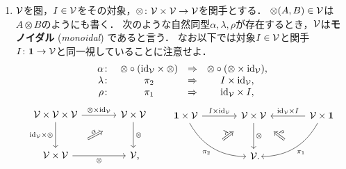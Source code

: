 \documentclass[uplatex,a4paper,dvipdfmx]{jsarticle}
\begin{document}
\begin{dfn}
    \label{dfn:monoidal_category}
    \begin{enumerate}
        \item ${\mathcal{V}}$を圏，$I \in {\mathcal{V}}$をその対象，$\otimes \colon {\mathcal{V}} \times {\mathcal{V}} \to {\mathcal{V}}$を関手とする．
            $\otimes(A, B) \in {\mathcal{V}}$は$A \otimes B$のようにも書く．
            次のような自然同型$\alpha, \lambda, \rho$が存在するとき，${\mathcal{V}}$は\textbf{モノイダル} (\textit{monoidal}) であると言う．
            なお以下では対象$I \in {\mathcal{V}}$と関手$I \colon \mathbf{1} \to {\mathcal{V}}$と同一視していることに注意せよ．
            \begin{equation*}
                \begin{array}{rccc}
                    \alpha \colon & \otimes \circ (\mathrm{id}_{\mathcal{V}} \times \otimes) & \Rightarrow & \otimes \circ (\otimes \times \mathrm{id}_{\mathcal{V}}), \\
                    \lambda \colon & \pi_2 & \Rightarrow & I \times \mathrm{id}_{\mathcal{V}}, \\
                    \rho \colon & \pi_1 & \Rightarrow & \mathrm{id}_{\mathcal{V}} \times I,
                \end{array}
            \end{equation*}
            \begin{equation} \label{equation:diagram_monoidal_isomorphisms}
                \begin{tikzcd}[sep=large]
                    \Vcal \times \Vcal \times \Vcal  \arrow[r, "\otimes \times \id_\Vcal"] \arrow[d, "\id_\Vcal \times \otimes"'] & \Vcal \times \Vcal \arrow[d, "\otimes"] \\
                    \Vcal \arrow[ur, Rightarrow, shorten=7mm, "\alpha" sloped]\times \Vcal \arrow[r, "\otimes"'] & \Vcal\rlap{,}
                \end{tikzcd}
                \qquad
                \begin{tikzcd}[sep=large]
                    \onebf \times \Vcal \arrow[r, "I \times \id_\Vcal"] \arrow[rd, bend right, "\pi_2"' name=X]
                        & \Vcal \times \Vcal \arrow[d, "\otimes"] \arrow[Rightarrow, from=X, shorten=5mm, "\lambda" sloped]
                        & \arrow[l, "\id_\Vcal \times I"'] \Vcal \times \onebf \arrow[ld, bend left, "\pi_1" name=Y]  \arrow[Rightarrow, from=Y, to=1-2, shorten=5mm, "\rho" sloped] \\
                        & \Vcal\rlap{.}
                \end{tikzcd}
            \end{equation}

\end{enumerate}
\end{dfn}
\end{document}
